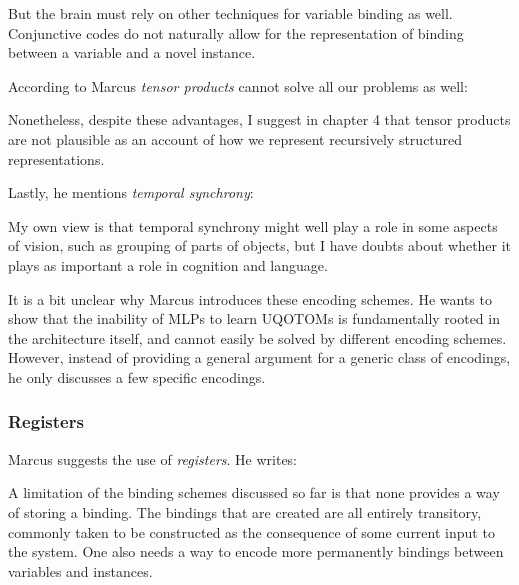 \documentclass[../../main.tex]{subfiles}
\begin{document}
\begin{citecallout}
    But the brain must rely on other techniques for variable binding as
    well. Conjunctive codes do not naturally allow for the representation of
    binding between a variable and a novel instance.
\end{citecallout}

According to Marcus \emph{tensor products} cannot solve all our problems as well:

\begin{citecallout}
    Nonetheless, despite these advantages, I suggest in chapter 4
    that tensor products are not plausible as an account of how we represent
    recursively structured representations.
\end{citecallout}

Lastly, he mentions \emph{temporal synchrony}:

\begin{citecallout}
    My own view is that temporal synchrony might well play a role in
    some aspects of vision, such as grouping of parts of objects, but I have
    doubts about whether it plays as important a role in cognition and language.
\end{citecallout}

\begin{critique}
    It is a bit unclear why Marcus introduces these encoding schemes. He wants to show that the inability of MLPs to learn UQOTOMs is fundamentally rooted in the architecture itself, and cannot easily be solved by different encoding schemes. However, instead of providing a general argument for a generic class of encodings, he only discusses a few specific encodings.
\end{critique}

\subsubsection{Registers}
Marcus suggests the use of \emph{registers}. He writes:

\begin{citecallout}
    A limitation of the binding schemes discussed so far is that none provides a way of storing a binding. The bindings that are created are all entirely transitory, commonly taken to be constructed as the consequence
    of some current input to the system. One also needs a way to encode
    more permanently bindings between variables and instances.
\end{citecallout}
\end{document}
